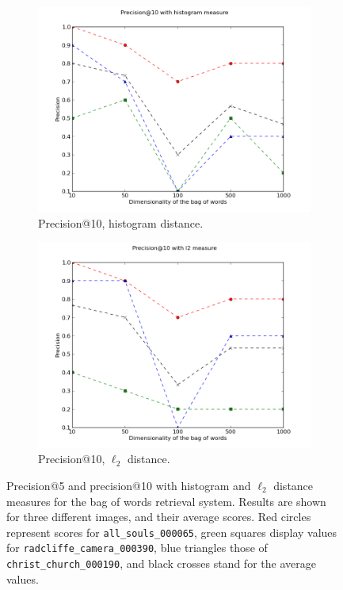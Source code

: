 \documentclass[a4paper,10pt,twoside]{article}
\begin{document}
\begin{figure}
\begin{subfigure}{0.47\textwidth}
    \includegraphics[width=\textwidth]{p10h}
    \caption{Precision@10, histogram distance.}
  \end{subfigure}
  \hspace*{\fill}
  \begin{subfigure}{0.47\textwidth}
    \centering
    \includegraphics[width=\textwidth]{p10l}
    \caption{Precision@10, $\ell_2$ distance.}
  \end{subfigure}
  \caption{Precision@5 and precision@10 with histogram and $\ell_2$ distance measures for the bag of words retrieval system.  Results are shown for three different images, and their average scores.  Red circles represent scores for \texttt{all\_souls\_000065}, green squares display values for \texttt{radcliffe\_camera\_000390}, blue triangles those of \texttt{christ\_church\_000190}, and black crosses stand for the average values.}
  \label{fig:precision}
\end{figure}
\end{document}
